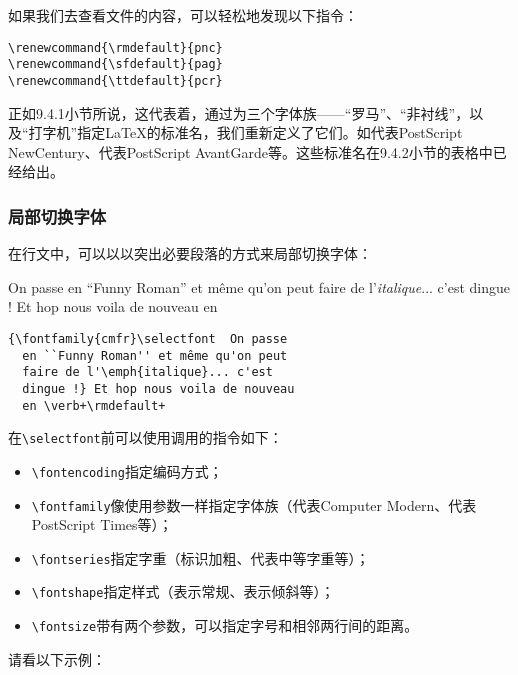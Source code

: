   如果我们去查看文件的内容，可以轻松地发现以下指令：

  \begin{dmd}
  \begin{verbatim}
\renewcommand{\rmdefault}{pnc}
\renewcommand{\sfdefault}{pag}
\renewcommand{\ttdefault}{pcr}
  \end{verbatim}
  \end{dmd}

正如9.4.1小节所说，这代表着，通过为三个字体族——“罗马”、“非衬线”，以及“打字机”指定\LaTeX 的标准名，我们重新定义了它们。如代表PostScript NewCentury、代表PostScript AvantGarde等。这些标准名在9.4.2小节的表格中已经给出。

\subsubsection{局部切换字体}

在行文中，可以以以突出必要段落的方式来局部切换字体：

\begin{codelist}[9.13]{
    { \selectfont  On passe
    en ``Funny Roman'' et même qu'on peut
    faire de l'\emph{italique}... c'est
    dingue !} Et hop nous voila de nouveau
    en 
}\begin{verbatim}
{\fontfamily{cmfr}\selectfont  On passe
  en ``Funny Roman'' et même qu'on peut
  faire de l'\emph{italique}... c'est
  dingue !} Et hop nous voila de nouveau
  en \verb+\rmdefault+
\end{verbatim}
\end{codelist}

在\verb|\selectfont|前可以使用调用的指令如下：

\begin{itemize}
    \item \verb|\fontencoding|指定编码方式；
    \item \verb|\fontfamily|像使用参数一样指定字体族（代表Computer Modern、代表PostScript Times等）；
    \item \verb|\fontseries|指定字重（标识加粗、代表中等字重等）；
    \item \verb|\fontshape|指定样式（表示常规、表示倾斜等）；
    \item \verb|\fontsize|带有两个参数，可以指定字号和相邻两行间的距离。
\end{itemize}

请看以下示例：

